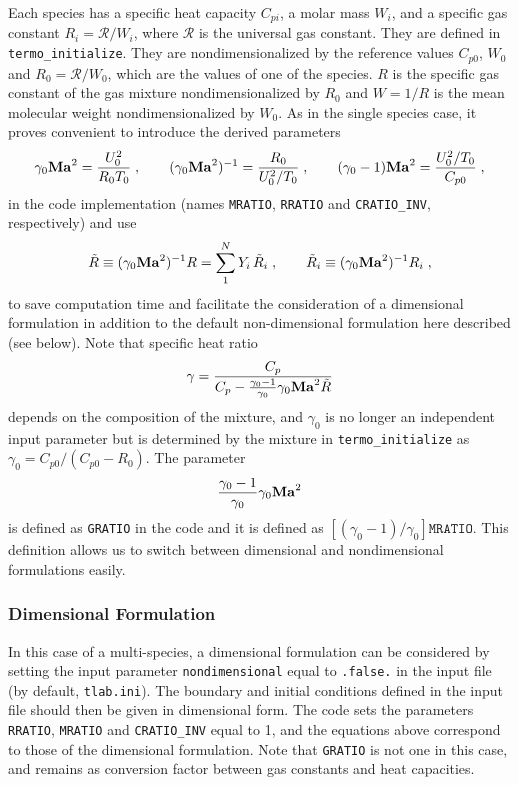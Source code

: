Each species has a specific heat capacity $C_{pi}$, a molar mass $W_i$, and a specific gas constant $R_i=\mathcal{R}/W_i$, where  $\mathcal{R}$ is the universal gas constant. They are defined in \texttt{termo\_initialize}. They are nondimensionalized by the reference values $C_{p0}$, $W_0$ and $R_0=\mathcal{R}/W_0$, which are the values of one of the species. $R$ is the specific gas constant of the gas mixture nondimensionalized by $R_0$ and $W=1/R$ is the mean molecular weight nondimensionalized by $W_0$. As in the single species case, it proves convenient to introduce the derived parameters
\begin{equation}
    \gamma_0\mathrm{\bf Ma}^2=\frac{U_0^2}{R_0T_0}\;,\qquad (\gamma_0\mathrm{\bf Ma}^2)^{-1}=\frac{R_0}{U^2_0/T_0}\;,\qquad (\gamma_0-1)\mathrm{\bf Ma}^2 =\frac{U_0^2/T_0}{C_{p0}} \;,
\end{equation}
in the code implementation (names \texttt{MRATIO}, \texttt{RRATIO} and \texttt{CRATIO\_INV}, respectively) and use 
\begin{equation}
    \tilde{R}\equiv (\gamma_0\mathrm{\bf Ma}^2)^{-1}R=\sum_1^NY_i\,\tilde{R}_i\;,\qquad\tilde{R}_i\equiv (\gamma_0\mathrm{\bf Ma}^2)^{-1}R_i
    \;,
\end{equation}
to save computation time and facilitate the consideration of a dimensional formulation in addition to the default non-dimensional formulation here described (see below). Note that specific heat ratio
\begin{equation}
    \gamma=\frac{C_p}{C_p-\frac{\gamma_0-1}{\gamma_0}\gamma_0\mathrm{\bf Ma}^2\tilde{R}}
\end{equation}
depends on the composition of the mixture, and $\gamma_0$ is no longer an independent input parameter but is determined by the mixture in \texttt{termo\_initialize} as $\gamma_0=C_{p0}/(C_{p0}-R_0)$. The parameter
\begin{equation}
    \frac{\gamma_0-1}{\gamma_0}\gamma_0\mathrm{\bf Ma}^2
\end{equation}
is defined as \texttt{GRATIO} in the code and it is defined as $[(\gamma_0-1)/\gamma_0]\texttt{MRATIO}$. This definition allows us to switch between dimensional and nondimensional formulations easily.


\subsubsection{Dimensional Formulation}

In this case of a multi-species, a dimensional formulation can be considered by setting the input parameter \texttt{nondimensional} equal to \texttt{.false.} in the input file (by default, \texttt{tlab.ini}). The boundary and initial conditions defined in the input file should then be given in dimensional form. The code sets the parameters \texttt{RRATIO}, \texttt{MRATIO} and \texttt{CRATIO\_INV} equal to 1, and the equations above correspond to those of the dimensional formulation. Note that \texttt{GRATIO} is not one in this case, and remains as conversion factor between gas constants and heat capacities.

